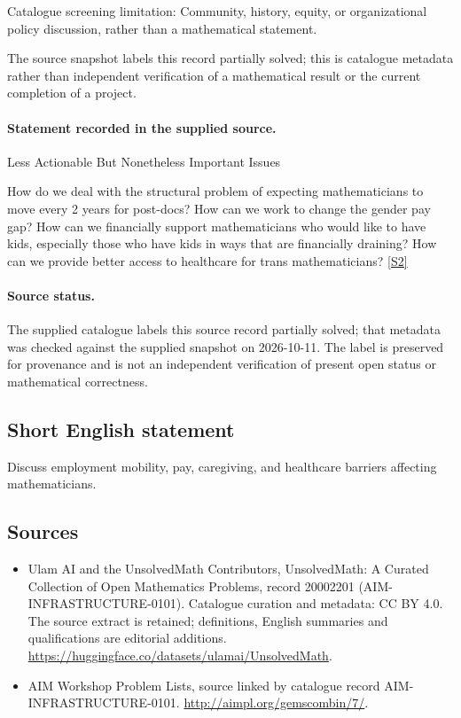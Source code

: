 \documentclass[11pt]{article}
\begin{document}
Catalogue screening limitation: Community, history, equity, or organizational policy discussion, rather than a mathematical statement.

The source snapshot labels this record partially solved; this is catalogue metadata rather than independent verification of a mathematical result or the current completion of a project.
\paragraph{Statement recorded in the supplied source.}
Less Actionable But Nonetheless Important Issues

How do we deal with the structural problem of expecting mathematicians to move every 2 years for post-docs? How can we work to change the gender pay gap? How can we financially support mathematicians who would like to have kids, especially those who have kids in ways that are financially draining? How can we provide better access to healthcare for trans mathematicians? \href{http://aimpl.org/gemscombin/7/}{[S2]}
\paragraph{Source status.}
The supplied catalogue labels this source record partially solved; that metadata was checked against the supplied snapshot on 2026-10-11. The label is preserved for provenance and is not an independent verification of present open status or mathematical correctness.
\subsection{Short English statement}
Discuss employment mobility, pay, caregiving, and healthcare barriers affecting mathematicians.
\subsection{Sources}
\begin{itemize}
\item[S1] Ulam AI and the UnsolvedMath Contributors, UnsolvedMath: A Curated Collection of Open Mathematics Problems, record 20002201 (AIM-INFRASTRUCTURE-0101). Catalogue curation and metadata: CC BY 4.0. The source extract is retained; definitions, English summaries and qualifications are editorial additions.
\url{https://huggingface.co/datasets/ulamai/UnsolvedMath}.
\item[S2] AIM Workshop Problem Lists, source linked by catalogue record AIM-INFRASTRUCTURE-0101.
\url{http://aimpl.org/gemscombin/7/}.
\end{itemize}
\end{document}
